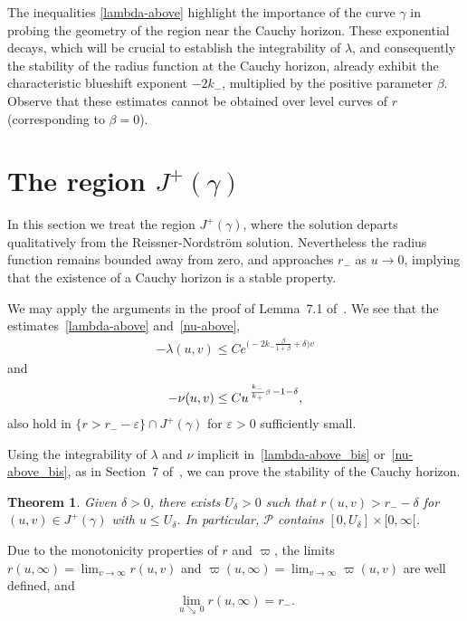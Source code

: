 \documentclass[a4paper,11pt,oneside,reqno]{amsart}
\newcommand{\kk}{k_+}
\newcommand{\kkk}{k_-}
\newtheorem{Thm}{Theorem}[section]
\newcommand{\cal}{\mathcal}
\newcommand{\eps}{\varepsilon}
\begin{document}
\bigskip

The inequalities \eqref{lambda-above} highlight the importance of the curve $\gamma$ in probing the geometry of the region near the Cauchy horizon. These exponential decays, which will be crucial to establish the integrability of $\lambda$, and consequently the stability of the radius function at the Cauchy horizon, already exhibit the characteristic blueshift exponent $-2k_-$, multiplied by the positive parameter $\beta$. Observe that these estimates cannot be obtained over level curves of $r$ (corresponding to $\beta=0$).


\section{The region $J^+(\gamma)$}\label{section8}

In this section we treat the region $J^+(\gamma)$, where the solution departs qualitatively from the Reissner-Nordstr\"{o}m solution. Nevertheless the radius function remains bounded away from zero, and approaches $r_-$ as $u \to 0$, implying that the existence of a Cauchy horizon is a stable property.

We may apply the arguments in the proof of Lemma~7.1 of~\cite{relIst2}.
We see that the estimates~\eqref{lambda-above} and~\eqref{nu-above},
 \begin{eqnarray} 
  -\lambda(u,v)\leq
  Ce^{\bigl(-2\kkk \frac\beta{1+\beta}+\delta\bigr)v}\label{lambda-above_bis}
 \end{eqnarray}
 and
  \begin{eqnarray}
  -\nu(u,v)\leq
 Cu^{\mbox{\tiny$\,\frac{\kkk}{\kk}\beta$}\,-1-\delta},
  \label{nu-above_bis}
  \end{eqnarray}
also hold in $\{ r > r_- - \eps \}\cap J^+(\gamma)$ for $\eps>0$ sufficiently small. 

Using the integrability of $\lambda$ and $\nu$ implicit in~\eqref{lambda-above_bis} or~\eqref{nu-above_bis}, as in Section~7 of~\cite{relIst2},
we can prove the stability of the Cauchy horizon.

\begin{Thm}\label{stability_of_Cauchy_horizon}
Given $\delta>0$, there exists $U_\delta>0$ such that $r(u,v)>r_--\delta$ for $(u,v)\in J^+(\gamma)$
with $u\leq U_\delta$. In particular, ${\cal P}$ contains
$[0,U_\delta]\times[0,\infty[$. 
\end{Thm}

Due to the monotonicity properties of $r$ and $\varpi$, the limits $r(u,\infty)=\lim_{v\to\infty}r(u,v)$ and $\varpi(u,\infty)=\lim_{v\to\infty}\varpi(u,v)$ are
well defined, and 
$$\lim_{u\searrow\, 0}r(u,\infty)=r_-.$$
\end{document}
